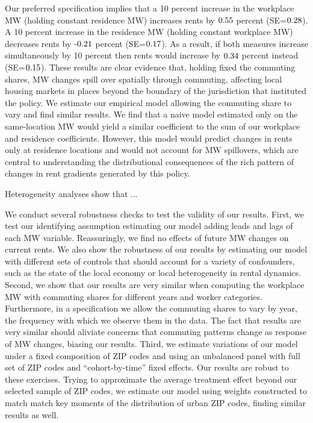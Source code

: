 
Our preferred specification implies that 
a 10 percent increase in the workplace MW (holding constant residence MW) 
increases rents by $\textnormal{0.55}$ percent 
(SE=$\textnormal{0.28}$).
A 10 percent increase in the residence MW (holding 
constant workplace MW) decreases rents by $\textnormal{-0.21}$ percent 
(SE=$\textnormal{0.17}$). 
As a result, if both measures increase simultaneously by 10 percent then 
rents would increase by $\textnormal{0.34}$ percent instead 
(SE=$\textnormal{0.15}$).
These results are clear evidence that, holding fixed the commuting shares, MW 
changes spill over spatially through commuting, affecting local housing markets 
in places beyond the boundary of the jurisdiction that instituted the policy.
We estimate our empirical model allowing the commuting share to vary and find 
similar results.
We find that a naive model estimated only on the same-location MW would yield a 
similar coefficient to the sum of our workplace and residence coefficients.
However, this model would predict changes in rents only at residence locations 
and would not account for MW spillovers, which are central to understanding the 
distributional consequences of the rich pattern of changes in rent gradients
generated by this policy.

Heterogeneity analyses show that ...


We conduct several robustness checks to test the validity of our results.
First, we test our identifying assumption estimating our model adding leads and 
lags of each MW variable.
Reassuringly, we find no effects of future MW changes on current rents.
We also show the robustness of our results by estimating our model with 
different sets of controls that should account for a variety of confounders, 
such as the state of the local economy or local heterogeneity in 
rental dynamics.
Second, we show that our results are very similar when computing the workplace
MW with commuting shares for different years and worker categories.
Furthermore, in a specification we allow the commuting shares to vary by year, 
the frequency with which we observe them in the data.
The fact that results are very similar should aliviate concerns that commuting 
patterns change as response of MW changes, biasing our results.
Third, we estimate variations of our model under a fixed composition of ZIP 
codes and using an unbalanced panel with full set of ZIP codes and 
``cohort-by-time'' fixed effects.
Our results are robust to these exercises.
Trying to approximate the average treatment effect beyond our selected sample 
of ZIP codes, we estimate our model using weights constructed to match match 
key moments of the distribution of urban ZIP codes, finding similar results
as well.

